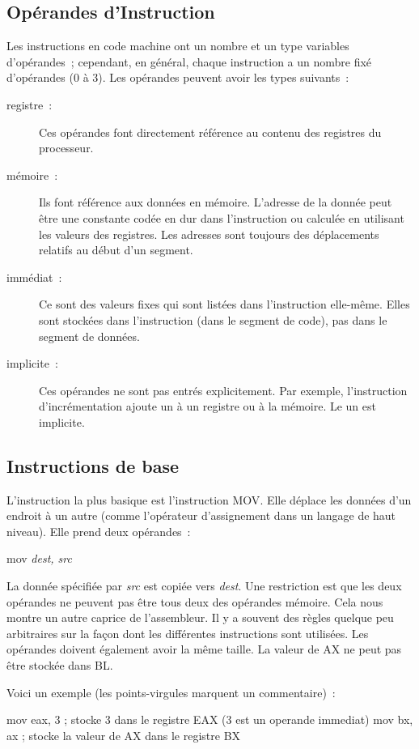 \subsection{Opérandes d'Instruction}

Les instructions en code machine ont un nombre et un type variables d'opérandes~; 
cependant, en général, chaque instruction a un nombre fixé d'opérandes (0 à 3).
Les opérandes peuvent avoir les types suivants~:
\begin{description}
\item[registre~:]
Ces opérandes font directement référence au contenu des registres du processeur.
\item[mémoire~:]
Ils font référence aux données en mémoire. L'adresse de la donnée peut être une constante
codée en dur dans l'instruction ou calculée en utilisant les valeurs des registres.
Les adresses sont toujours des déplacements relatifs au début d'un segment.
\item[immédiat~:]
Ce sont des valeurs fixes qui sont listées dans l'instruction elle-même. Elles sont
stockées dans l'instruction (dans le segment de code), pas dans le segment de données.
\item[implicite~:]
Ces opérandes ne sont pas entrés explicitement. Par exemple, l'instruction
d'incrémentation ajoute un à un registre ou à la mémoire. Le un est implicite.
\end{description}

\subsection{Instructions de base}

L'instruction la plus basique est l'instruction {\code MOV}. Elle déplace les données
d'un endroit à un autre (comme l'opérateur d'assignement dans un langage de
haut niveau). Elle prend deux opérandes~:
\begin{CodeQuote}
  mov {\em dest, src}
\end{CodeQuote}
La donnée spécifiée par {\em src} est copiée vers {\em dest\/}. Une restriction est
que les deux opérandes ne peuvent pas être tous deux des opérandes mémoire. Cela nous
montre un autre caprice de l'assembleur.  Il y a souvent des règles quelque peu
arbitraires sur la façon dont les différentes instructions sont utilisées. Les opérandes
doivent également avoir la même taille. La valeur de AX ne peut pas être stockée dans BL.

Voici un exemple (les points-virgules marquent un commentaire)~:
\begin{AsmCodeListing}[frame=none, numbers=none]
      mov    eax, 3  ; stocke 3 dans le registre EAX (3 est un operande immediat)
      mov    bx, ax  ; stocke la valeur de AX dans le registre BX
\end{AsmCodeListing}

